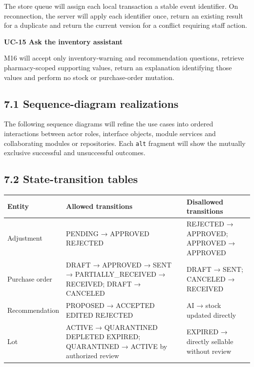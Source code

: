 The store queue will assign each local transaction a stable event identifier. On reconnection, the server will apply each identifier once, return an existing result for a duplicate and return the current version for a conflict requiring staff action.

\textbf{UC-15 Ask the inventory assistant}

M16 will accept only inventory-warning and recommendation questions, retrieve pharmacy-scoped supporting values, return an explanation identifying those values and perform no stock or purchase-order mutation.

\subsection{7.1 Sequence-diagram realizations}\label{sequence-diagram-realizations}

The following sequence diagrams will refine the use cases into ordered interactions between actor roles, interface objects, module services and collaborating modules or repositories. Each \texttt{alt} fragment will show the mutually exclusive successful and unsuccessful outcomes.



\subsection{7.2 State-transition tables}\label{state-transition-tables}

{\def\LTcaptype{none} %
\begin{longtable}[]{|
  >{\raggedright\arraybackslash}m{}|
  >{\raggedright\arraybackslash}m{}|
  >{\raggedright\arraybackslash}m{}|}
\hline
\begin{minipage}[c]{\linewidth}\raggedright
\textbf{Entity}
\end{minipage} & \begin{minipage}[c]{\linewidth}\raggedright
\textbf{Allowed transitions}
\end{minipage} & \begin{minipage}[c]{\linewidth}\raggedright
\textbf{Disallowed transitions}
\end{minipage} \\
\hline
\endhead

\endlastfoot
Adjustment & PENDING → APPROVED \textbar{} REJECTED & REJECTED → APPROVED; APPROVED → APPROVED \\ \hline
Purchase order & DRAFT → APPROVED → SENT → PARTIALLY\_RECEIVED → RECEIVED; DRAFT → CANCELED & DRAFT → SENT; CANCELED → RECEIVED \\ \hline
Recommendation & PROPOSED → ACCEPTED \textbar{} EDITED \textbar{} REJECTED & AI → stock updated directly \\ \hline
Lot & ACTIVE → QUARANTINED \textbar{} DEPLETED \textbar{} EXPIRED; QUARANTINED → ACTIVE by authorized review & EXPIRED → directly sellable without review \\ \hline
\end{longtable}
}

